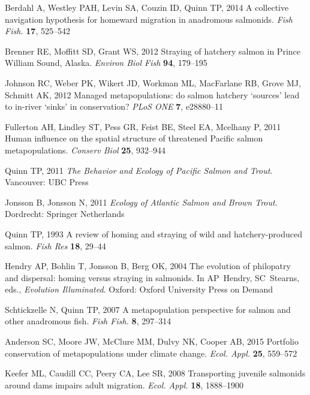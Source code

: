 \documentclass{revtex4}
\begin{document}
\begin{thebibliography}{10}
Berdahl A, Westley PAH, Levin SA, Couzin ID, Quinn TP, 2014 {A collective
  navigation hypothesis for homeward migration in anadromous salmonids}.
\newblock \emph{Fish Fish.} \textbf{17}, 525--542

Brenner RE, Moffitt SD, Grant WS, 2012 {Straying of hatchery salmon in Prince
  William Sound, Alaska}.
\newblock \emph{Environ Biol Fish} \textbf{94}, 179--195

Johnson RC, Weber PK, Wikert JD, Workman ML, MacFarlane RB, Grove MJ, Schmitt
  AK, 2012 {Managed metapopulations: do salmon hatchery
  {\textquoteleft}sources{\textquoteright} lead to in-river
  {\textquoteleft}sinks{\textquoteright} in conservation?}
\newblock \emph{PLoS ONE} \textbf{7}, e28880--11

Fullerton AH, Lindley ST, Pess GR, Feist BE, Steel EA, Mcelhany P, 2011 {Human
  influence on the spatial structure of threatened Pacific salmon
  metapopulations}.
\newblock \emph{Conserv Biol} \textbf{25}, 932--944

Quinn TP, 2011 \emph{{The Behavior and Ecology of Pacific Salmon and Trout}}.
\newblock Vancouver: UBC Press

Jonsson B, Jonsson N, 2011 \emph{{Ecology of Atlantic Salmon and Brown Trout}}.
\newblock Dordrecht: Springer Netherlands

Quinn TP, 1993 {A review of homing and straying of wild and hatchery-produced
  salmon}.
\newblock \emph{Fish Res} \textbf{18}, 29--44

Hendry AP, Bohlin T, Jonsson B, Berg OK, 2004 {The evolution of philopatry and
  dispersal: homing versus straying in salmonids}.
\newblock In AP~Hendry, SC~Stearns, eds., \emph{Evolution Illuminated}. Oxford:
  Oxford University Press on Demand

Schtickzelle N, Quinn TP, 2007 {A metapopulation perspective for salmon and
  other anadromous fish}.
\newblock \emph{Fish Fish.} \textbf{8}, 297--314

Anderson SC, Moore JW, McClure MM, Dulvy NK, Cooper AB, 2015 {Portfolio
  conservation of metapopulations under climate change}.
\newblock \emph{Ecol. Appl.} \textbf{25}, 559--572

Keefer ML, Caudill CC, Peery CA, Lee SR, 2008 {Transporting juvenile salmonids
  around dams impairs adult migration}.
\newblock \emph{Ecol. Appl.} \textbf{18}, 1888--1900


\end{thebibliography}
\end{document}
